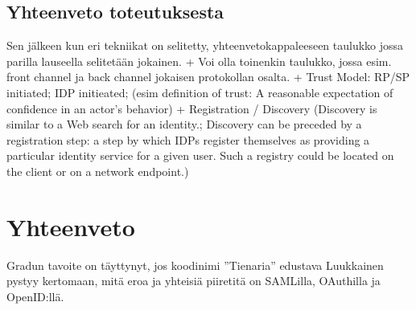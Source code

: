\documentclass[finnish,gradu]{tktltiki}
\begin{document}





  \subsection{Yhteenveto toteutuksesta} %
  \label{sub:yhteenveto_toteutuksesta}

  Sen jälkeen kun eri tekniikat on selitetty, yhteenvetokappaleeseen taulukko jossa parilla lauseella selitetään jokainen.
  + Voi olla toinenkin taulukko, jossa esim. front channel ja back channel jokaisen protokollan osalta.
  + Trust Model: RP/SP initiated; IDP initieated; (esim definition of trust: A reasonable expectation of confidence in an actor’s behavior)
  + Registration / Discovery (Discovery is similar to a Web search for an identity.; Discovery can be preceded by a registration step: a step by which IDPs register themselves as providing a particular identity service for a given user. Such a registry could be located on the client or on a network endpoint.)






\section{Yhteenveto} %
\label{sec:yhteenveto}

  Gradun tavoite on täyttynyt, jos koodinimi ''Tienaria'' edustava Luukkainen pystyy kertomaan, mitä eroa ja yhteisiä piiretitä on SAMLilla, OAuthilla ja OpenID:llä.





\lastpage
\end{document}
